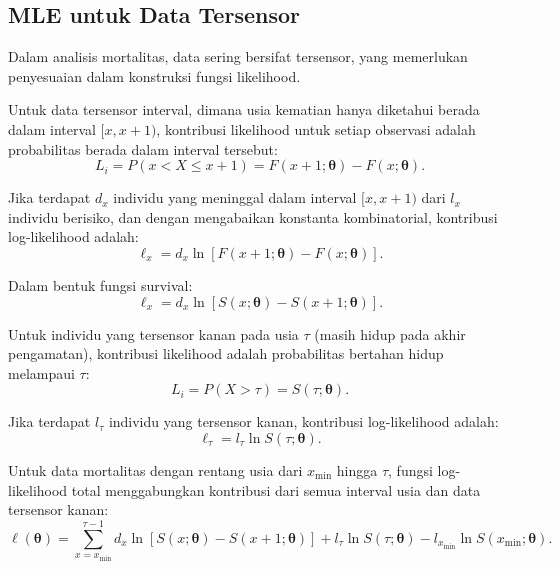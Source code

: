 \subsection{MLE untuk Data Tersensor}

Dalam analisis mortalitas, data sering bersifat tersensor, yang memerlukan penyesuaian dalam konstruksi fungsi likelihood.

Untuk data tersensor interval, dimana usia kematian hanya diketahui berada dalam interval $[x, x+1)$, kontribusi likelihood untuk setiap observasi adalah probabilitas berada dalam interval tersebut:
\begin{equation}
L_i = P(x < X \leq x+1) = F(x+1; \boldsymbol{\theta}) - F(x; \boldsymbol{\theta}).
\label{eq:likelihood_interval}
\end{equation}

Jika terdapat $d_x$ individu yang meninggal dalam interval $[x, x+1)$ dari $l_x$ individu berisiko, dan dengan mengabaikan konstanta kombinatorial, kontribusi log-likelihood adalah:
\begin{equation}
\ell_x = d_x \ln[F(x+1; \boldsymbol{\theta}) - F(x; \boldsymbol{\theta})].
\label{eq:loglik_interval}
\end{equation}

Dalam bentuk fungsi survival:
\begin{equation}
\ell_x = d_x \ln[S(x; \boldsymbol{\theta}) - S(x+1; \boldsymbol{\theta})].
\label{eq:loglik_interval_survival}
\end{equation}

Untuk individu yang tersensor kanan pada usia $\tau$ (masih hidup pada akhir pengamatan), kontribusi likelihood adalah probabilitas bertahan hidup melampaui $\tau$:
\begin{equation}
L_i = P(X > \tau) = S(\tau; \boldsymbol{\theta}).
\label{eq:likelihood_right_censored}
\end{equation}

Jika terdapat $l_\tau$ individu yang tersensor kanan, kontribusi log-likelihood adalah:
\begin{equation}
\ell_{\tau} = l_\tau \ln S(\tau; \boldsymbol{\theta}).
\label{eq:loglik_right_censored}
\end{equation}

Untuk data mortalitas dengan rentang usia dari $x_{\min}$ hingga $\tau$, fungsi log-likelihood total menggabungkan kontribusi dari semua interval usia dan data tersensor kanan:
\begin{equation}
\ell(\boldsymbol{\theta}) = \sum_{x=x_{\min}}^{\tau-1} d_x \ln[S(x; \boldsymbol{\theta}) - S(x+1; \boldsymbol{\theta})] + l_\tau \ln S(\tau; \boldsymbol{\theta}) - l_{x_{\min}} \ln S(x_{\min}; \boldsymbol{\theta}).
\label{eq:loglik_total_censored}
\end{equation}

